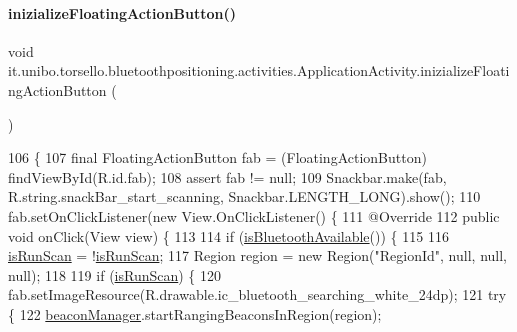 \paragraph{\texorpdfstring{inizialize\+Floating\+Action\+Button()}{inizializeFloatingActionButton()}}
{\footnotesize\ttfamily void it.\+unibo.\+torsello.\+bluetoothpositioning.\+activities.\+Application\+Activity.\+inizialize\+Floating\+Action\+Button (\begin{DoxyParamCaption}{ }\end{DoxyParamCaption})\hspace{0.3cm}{\ttfamily [private]}}


\begin{DoxyCode}
106                                                   \{
107         \textcolor{keyword}{final} FloatingActionButton fab = (FloatingActionButton) findViewById(R.id.fab);
108         assert fab != null;
109         Snackbar.make(fab, R.string.snackBar\_start\_scanning, Snackbar.LENGTH\_LONG).show();
110         fab.setOnClickListener(\textcolor{keyword}{new} View.OnClickListener() \{
111             @Override
112             \textcolor{keyword}{public} \textcolor{keywordtype}{void} onClick(View view) \{
113 
114                 \textcolor{keywordflow}{if} (\hyperlink{classit_1_1unibo_1_1torsello_1_1bluetoothpositioning_1_1activities_1_1ApplicationActivity_abffd55741be864ad5b151c8f8c6d70ff_abffd55741be864ad5b151c8f8c6d70ff}{isBluetoothAvailable}()) \{
115 
116                     \hyperlink{classit_1_1unibo_1_1torsello_1_1bluetoothpositioning_1_1activities_1_1ApplicationActivity_a16080640c95a73d18c2b7ec21b785af1_a16080640c95a73d18c2b7ec21b785af1}{isRunScan} = !\hyperlink{classit_1_1unibo_1_1torsello_1_1bluetoothpositioning_1_1activities_1_1ApplicationActivity_a16080640c95a73d18c2b7ec21b785af1_a16080640c95a73d18c2b7ec21b785af1}{isRunScan};
117                     Region region = \textcolor{keyword}{new} Region(\textcolor{stringliteral}{"RegionId"}, null, null, null);
118 
119                     \textcolor{keywordflow}{if} (\hyperlink{classit_1_1unibo_1_1torsello_1_1bluetoothpositioning_1_1activities_1_1ApplicationActivity_a16080640c95a73d18c2b7ec21b785af1_a16080640c95a73d18c2b7ec21b785af1}{isRunScan}) \{
120                         fab.setImageResource(R.drawable.ic\_bluetooth\_searching\_white\_24dp);
121                         \textcolor{keywordflow}{try} \{
122                             \hyperlink{classit_1_1unibo_1_1torsello_1_1bluetoothpositioning_1_1activities_1_1ApplicationActivity_a973c37226a3dbba6016966c3555aff65_a973c37226a3dbba6016966c3555aff65}{beaconManager}.startRangingBeaconsInRegion(region);

\end{DoxyCode}
